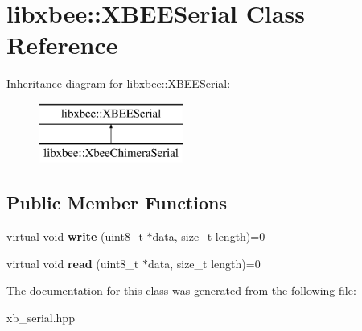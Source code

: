 \hypertarget{classlibxbee_1_1_x_b_e_e_serial}{}\section{libxbee\+:\+:X\+B\+E\+E\+Serial Class Reference}
\label{classlibxbee_1_1_x_b_e_e_serial}
Inheritance diagram for libxbee\+:\+:X\+B\+E\+E\+Serial\+:\begin{figure}[H]
\begin{center}
\leavevmode
\includegraphics[height=2.000000cm]{classlibxbee_1_1_x_b_e_e_serial}
\end{center}
\end{figure}
\subsection*{Public Member Functions}
\begin{DoxyCompactItemize}
\item 
\mbox{\label{classlibxbee_1_1_x_b_e_e_serial_ab18c88d5c4d1ab46f335ba68696fc6b6}} 
virtual void {\bfseries write} (uint8\+\_\+t $\ast$data, size\+\_\+t length)=0
\item 
\mbox{\label{classlibxbee_1_1_x_b_e_e_serial_a5044fb4e727f88d19f6c1ce55dd25d20}} 
virtual void {\bfseries read} (uint8\+\_\+t $\ast$data, size\+\_\+t length)=0
\end{DoxyCompactItemize}


The documentation for this class was generated from the following file\+:\begin{DoxyCompactItemize}
\item 
xb\+\_\+serial.\+hpp\end{DoxyCompactItemize}
